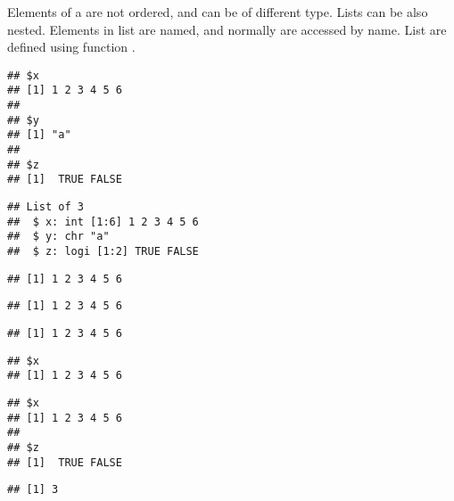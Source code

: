 \documentclass[paper=a4,10pt,div=17,headsepline,BCOR=12mm,twoside,open=right]{scrbook}\usepackage{knitr}
\begin{document}
Elements of a  are not ordered, and can be of different type. Lists can be also nested. Elements in list are named, and normally are accessed by name. List are defined using function .

\begin{knitrout}\footnotesize
{}\color{fgcolor}\begin{kframe}
\begin{alltt}
 \hlkwb{<-} \hlstd{(} \hlstd{=} \hlopt{:}\hlstd{,}  \hlstd{=} \hlstd{,}  \hlstd{=} \hlstd{(}\hlstd{,} \hlstd{))}
\end{alltt}
\begin{verbatim}
## $x
## [1] 1 2 3 4 5 6
## 
## $y
## [1] "a"
## 
## $z
## [1]  TRUE FALSE
\end{verbatim}
\begin{alltt}
\end{alltt}
\begin{verbatim}
## List of 3
##  $ x: int [1:6] 1 2 3 4 5 6
##  $ y: chr "a"
##  $ z: logi [1:2] TRUE FALSE
\end{verbatim}
\begin{alltt}
\hlopt{$}
\end{alltt}
\begin{verbatim}
## [1] 1 2 3 4 5 6
\end{verbatim}
\begin{alltt}
\hlstd{a.list[[}\hlstd{]]}
\end{alltt}
\begin{verbatim}
## [1] 1 2 3 4 5 6
\end{verbatim}
\begin{alltt}
\hlstd{a.list[[}\hlstd{]]}
\end{alltt}
\begin{verbatim}
## [1] 1 2 3 4 5 6
\end{verbatim}
\begin{alltt}
\hlstd{a.list[}\hlstd{]}
\end{alltt}
\begin{verbatim}
## $x
## [1] 1 2 3 4 5 6
\end{verbatim}
\begin{alltt}
\hlstd{a.list[}\hlstd{(}\hlstd{,}\hlstd{)]}
\end{alltt}
\begin{verbatim}
## $x
## [1] 1 2 3 4 5 6
## 
## $z
## [1]  TRUE FALSE
\end{verbatim}
\begin{alltt}
\hlstd{(a.list[[}\hlstd{(}\hlstd{,}\hlstd{)]])}
\end{alltt}
\begin{verbatim}
## [1] 3
\end{verbatim}
\end{kframe}
\end{knitrout}
\end{document}
